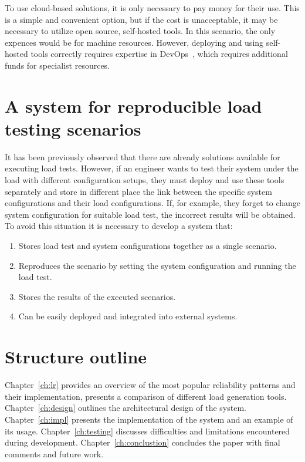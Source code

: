 To use cloud-based solutions, it is only necessary to pay money for their use. This is a simple and convenient option, but if the cost is unacceptable, it may be necessary to utilize open source, self-hosted tools. In this scenario, the only expences would be for machine resources. However, deploying and using self-hosted tools correctly requires expertise in DevOps~\cite{devops}, which requires additional funds for specialist resources.


\section{A system for reproducible load testing scenarios}\label{sec:purpose}
It has been previously observed that there are already solutions available for executing load tests. However, if an engineer wants to test their system under the load with different configuration setups, they must deploy and use these tools separately and store in different place the link between the specific system configurations and their load configurations. If, for example, they forget to change system configuration for suitable load test, the incorrect results will be obtained. To avoid this situation it is necessary to develop a system that:
\begin{enumerate}
    \item Stores load test and system configurations together as a single scenario.
    \item Reproduces the scenario by setting the system configuration and running the load test.
    \item Stores the results of the executed scenarios.
    \item Can be easily deployed and integrated into external systems.
\end{enumerate}


\section{Structure outline}\label{sec:structure-outline}
Chapter~\ref{ch:lr} provides an overview of the most popular reliability patterns and their implementation, presents a comparison of different load generation tools. Chapter~\ref{ch:design} outlines the architectural design of the system. Chapter~\ref{ch:impl} presents the implementation of the system and an example of its usage. Chapter~\ref{ch:testing} discusses difficulties and limitations encountered during development. Chapter~\ref{ch:conclustion} concludes the paper with final comments and future work.